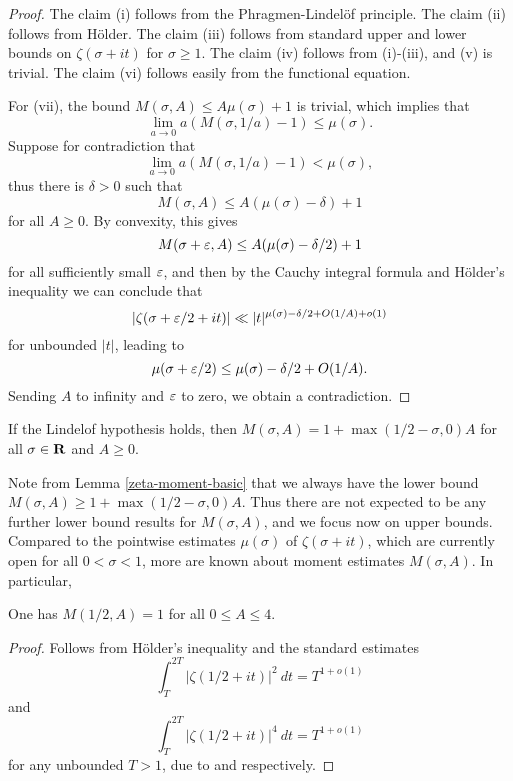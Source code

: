 \begin{proof} The claim (i) follows from the Phragmen-Lindel\"of principle.  The claim (ii) follows from H\"older.  The claim (iii) follows from standard upper and lower bounds on $\zeta(\sigma+it)$ for $\sigma \geq 1$. The claim (iv) follows from (i)-(iii), and (v) is trivial. The claim (vi) follows easily from the functional equation.

For (vii), the bound $M(\sigma,A) \leq A \mu(\sigma) + 1$ is trivial, which implies that
$$ \lim_{a \to 0} a(M(\sigma,1/a)-1) \leq \mu(\sigma).$$
Suppose for contradiction that
$$ \lim_{a \to 0} a(M(\sigma,1/a)-1) < \mu(\sigma),$$
thus there is $\delta>0$ such that
$$M(\sigma,A) \leq A (\mu(\sigma)-\delta) + 1$$
for all $A\geq 0$.  By convexity, this gives
$$M(\sigma+\varepsilon,A) \leq A (\mu(\sigma)-\delta/2) + 1$$
for all sufficiently small $\varepsilon$, and then by the Cauchy integral formula and H\"older's inequality we can conclude that
$$ |\zeta(\sigma+\varepsilon/2 +it)| \ll |t|^{\mu(\sigma)-\delta/2 + O(1/A) + o(1)} $$
for unbounded $|t|$, leading to
$$ \mu(\sigma+\varepsilon/2) \leq \mu(\sigma)-\delta/2 + O(1/A).$$
Sending $A$ to infinity and $\varepsilon$ to zero, we obtain a contradiction.
\end{proof}

\begin{corollary}\label{moment_from_lindelof} If the Lindelof hypothesis holds, then $M(\sigma,A) = 1 + \max(1/2-\sigma,0) A$ for all $\sigma \in \mathbf{R}$ and $A \geq 0$.
\end{corollary}

Note from Lemma \ref{zeta-moment-basic} that we always have the lower bound $M(\sigma,A) \geq 1 + \max(1/2-\sigma,0) A$.  Thus there are not expected to be any further lower bound results for $M(\sigma,A)$, and we focus now on upper bounds. Compared to the pointwise estimates $\mu(\sigma)$ of $\zeta(\sigma + it)$, which are currently open for all $0 < \sigma < 1$, more are known about moment estimates $M(\sigma, A)$. In particular, 

\begin{lemma}\label{mad_known_est}One has $M(1/2,A)=1$ for all $0 \leq A \leq 4$.
\end{lemma}
\begin{proof}
Follows from H\"older's inequality and the standard estimates
$$ \int_T^{2T} |\zeta(1/2+it)|^2\ dt = T^{1+o(1)}$$
and 
$$ \int_T^{2T} |\zeta(1/2+it)|^4\ dt = T^{1+o(1)}$$
for any unbounded $T>1$, due to \cite{hardy_contributions_1916} and \cite{hardy_littlewood_approximate_1923} respectively. 
\end{proof}

